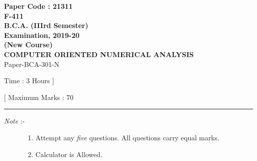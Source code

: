 \documentclass[12pt]{article}
\begin{document}
\pagestyle{empty}

\begin{center}

	\textsf{
		\textbf{
			\LARGE Paper Code : 21311\\
			\normalsize F-411\\
			B.C.A. (IIIrd Semester)\\
			Examination, 2019-20\\
			(New Course)\\
			\small{COMPUTER ORIENTED NUMERICAL ANALYSIS\\}
		}
		Paper-BCA-301-N
	}

	\begin{minipage}{0.49\linewidth}
		\raggedright\footnotesize Time : 3 Hours ]
	\end{minipage}
	\begin{minipage}{0.49\linewidth}
		\raggedleft\footnotesize [ Maximum Marks : 70
	\end{minipage}

\end{center}

\rule{0.9\linewidth}{0.1mm}

\begin{description}
	\item[\textit{Note }:-]
	\begin{enumerate}
		\item Attempt any \textit{five} questions. All questions carry equal marks.
		\item Calculator is Allowed.
	\end{enumerate} 
\end{description}
\end{document}
